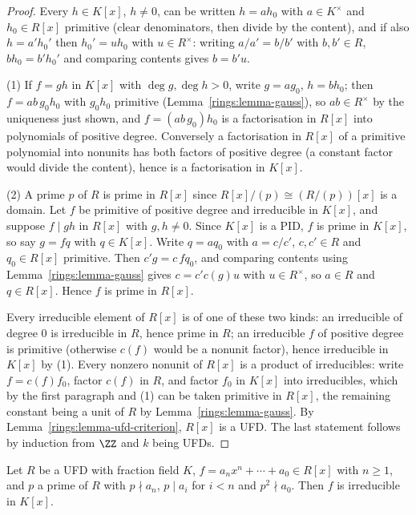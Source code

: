 \begin{proof}
Every $h \in K[x]$, $h \neq 0$, can be written $h = a h_0$ with $a \in K^\times$ and
$h_0 \in R[x]$ primitive (clear denominators, then divide by the content), and if also
$h = a' h_0'$ then $h_0' = u h_0$ with $u \in R^\times$: writing $a/a' = b/b'$ with $b, b' \in R$,
$b h_0 = b' h_0'$ and comparing contents gives $b = b'u$.

(1) If $f = gh$ in $K[x]$ with $\deg g, \deg h > 0$, write $g = ag_0$, $h = bh_0$; then
$f = ab\, g_0h_0$ with $g_0h_0$ primitive (Lemma~\ref{rings:lemma-gauss}), so $ab \in R^\times$ by
the uniqueness just shown, and $f = (ab\, g_0)h_0$ is a factorisation in $R[x]$ into
polynomials of positive degree. Conversely a factorisation in $R[x]$ of a primitive
polynomial into nonunits has both factors of positive degree (a constant factor would
divide the content), hence is a factorisation in $K[x]$.

(2) A prime $p$ of $R$ is prime in $R[x]$ since $R[x]/(p) \cong (R/(p))[x]$ is a domain. Let
$f$ be primitive of positive degree and irreducible in $K[x]$, and suppose $f \mid gh$ in
$R[x]$ with $g, h \neq 0$. Since $K[x]$ is a PID, $f$ is prime in $K[x]$, so say $g = fq$ with
$q \in K[x]$. Write $q = aq_0$ with $a = c/c'$, $c, c' \in R$ and $q_0 \in R[x]$ primitive. Then
$c'g = c\,fq_0$, and comparing contents using Lemma~\ref{rings:lemma-gauss} gives
$c = c'c(g)u$ with $u \in R^\times$, so $a \in R$ and $q \in R[x]$. Hence $f$ is prime in $R[x]$.

Every irreducible element of $R[x]$ is of one of these two kinds: an irreducible of degree
$0$ is irreducible in $R$, hence prime in $R$; an irreducible $f$ of positive degree is
primitive (otherwise $c(f)$ would be a nonunit factor), hence irreducible in $K[x]$ by (1).
Every nonzero nonunit of $R[x]$ is a product of irreducibles: write $f = c(f) f_0$, factor
$c(f)$ in $R$, and factor $f_0$ in $K[x]$ into irreducibles, which by the first paragraph
and (1) can be taken primitive in $R[x]$, the remaining constant being a unit of $R$ by
Lemma~\ref{rings:lemma-gauss}. By Lemma~\ref{rings:lemma-ufd-criterion}, $R[x]$ is a UFD.
The last statement follows by induction from $\ZZ$ and $k$ being UFDs.
\end{proof}

\begin{proposition}\label{rings:proposition-eisenstein}
Let $R$ be a UFD with fraction field $K$, $f = a_nx^n + \cdots + a_0 \in R[x]$ with $n \geq 1$,
and $p$ a prime of $R$ with $p \nmid a_n$, $p \mid a_i$ for $i < n$ and $p^2 \nmid a_0$. Then $f$ is
irreducible in $K[x]$.
\end{proposition}

